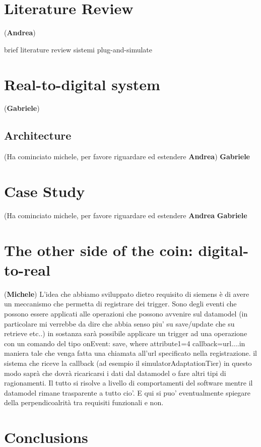 \documentclass{riverk}
\begin{document}
\section{Literature Review}
(\textbf{Andrea})

brief literature review sistemi plug-and-simulate


\section{Real-to-digital system}
(\textbf{Gabriele})


\subsection{Architecture}
(Ha cominciato michele, per favore riguardare ed estendere \textbf{Andrea}) \textbf{Gabriele}




\section{Case Study}
(Ha cominciato michele, per favore riguardare ed estendere \textbf{Andrea} \textbf{Gabriele}


\section{The other side of the coin: digital-to-real}
(\textbf{Michele})
L'idea che abbiamo sviluppato dietro requisito di siemens è di avere un meccanismo che permetta di registrare 
dei trigger. Sono degli eventi che possono essere applicati alle operazioni che possono avvenire sul datamodel (in particolare mi verrebbe da dire che abbia senso piu' su save/update che su retrieve etc..) in sostanza sarà possibile applicare un trigger ad una operazione con un comando del tipo  onEvent: save, where attribute1=4 callback=url....in maniera tale che venga fatta una chiamata all'url specificato nella registrazione. il sistema che riceve la callback (ad esempio il simulatorAdaptationTier) in questo modo saprà che dovrà ricaricarsi i dati dal datamodel o fare altri tipi di ragionamenti. 
Il tutto si risolve a livello di comportamenti del software mentre il datamodel rimane trasparente a tutto cio'. E qui si puo' eventualmente spiegare della perpendicoalrità tra requisiti funzionali e non.



\section{Conclusions}







\end{document}
